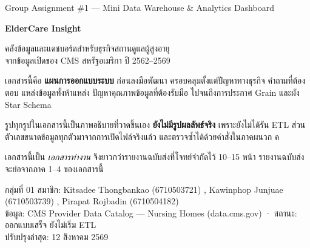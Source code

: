 \documentclass[11pt,a4paper]{article}
\newcommand{\sansall}{\sffamily}
\begin{document}
\begin{titlepage}
\thispagestyle{empty}

\vspace*{1.4cm}
{\sansall\color{muted}\small Group Assignment \#1 — Mini Data Warehouse \& Analytics Dashboard}

\vspace{0.9cm}
{\sansall\bfseries\fontsize{27}{33}\selectfont\color{src!90!black}
ElderCare Insight\par}

\vspace{0.5cm}
{\sansall\fontsize{13.5}{19}\selectfont\color{ink}
\vspace{\baselineskip}
\vspace{\baselineskip}
คลังข้อมูลและแดชบอร์ดสำหรับธุรกิจสถานดูแลผู้สูงอายุ\\
จากข้อมูลเปิดของ CMS สหรัฐอเมริกา ปี 2562--2569\par}

\vspace{3.0cm}

\begin{minipage}{0.66\textwidth}
เอกสารนี้คือ \textbf{แผนการออกแบบระบบ} ก่อนลงมือพัฒนา ครอบคลุมตั้งแต่ปัญหาทางธุรกิจ
คำถามที่ต้องตอบ แหล่งข้อมูลทั้งห้าแหล่ง ปัญหาคุณภาพข้อมูลที่ต้องรับมือ
ไปจนถึงการประกาศ Grain และผัง Star Schema

\vspace{0.6em}
รูปทุกรูปในเอกสารนี้เป็นภาพอธิบายที่วาดขึ้นเอง \textbf{ยังไม่มีรูปผลลัพธ์จริง}
เพราะยังไม่ได้รัน ETL ส่วนตัวเลขขนาดข้อมูลทุกตัวมาจากการเปิดไฟล์จริงแล้ว
และตรวจซ้ำได้ด้วยคำสั่งในภาคผนวก ค

\vspace{0.6em}
เอกสารนี้เป็น \emph{เอกสารทำงาน} จึงยาวกว่ารายงานฉบับส่งที่โจทย์จำกัดไว้ 10--15 หน้า
รายงานฉบับส่งจะย่อจากภาค 1--4 ของเอกสารนี้
\end{minipage}

\vfill
{}
\vspace{0.3em}

{\sansall\footnotesize\color{muted}
กลุ่มที่ 01 \quad สมาชิก:
Kitsadee Thongbankao (6710503721) ,
Kawinphop Junjuae (6710503739) ,
Pirapat Rojbadin (6710504182) \\
ข้อมูล: CMS Provider Data Catalog — Nursing Homes (data.cms.gov) ·
สถานะ: ออกแบบเสร็จ ยังไม่เริ่ม ETL \\
ปรับปรุงล่าสุด: 12 สิงหาคม 2569}
\end{titlepage}
\end{document}
